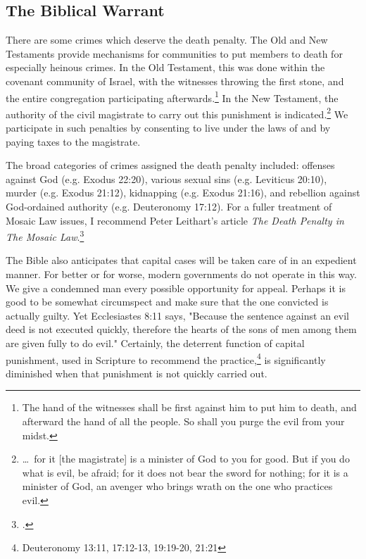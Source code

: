 \subsection{The Biblical Warrant}
There are some crimes which deserve the death penalty.  The Old and New Testaments provide mechanisms for communities to put members to death for especially heinous crimes.  In the Old Testament, this was done within the covenant community of Israel, with the witnesses throwing the first stone, and the entire congregation participating afterwards.\footnote{The hand of the witnesses shall be first against him to put him to death, and afterward the hand of all the people.  So shall you purge the evil from your midst.}  In the New Testament, the authority of the civil magistrate to carry out this punishment is indicated.\footnote{\ldots\ for it [the magistrate] is a minister of God to you for good.  But if you do what is evil, be afraid; for it does not bear the sword for nothing; for it is a minister of God, an avenger who brings wrath on the one who practices evil.}  We participate in such penalties by consenting to live under the laws of and by paying taxes to the magistrate.

The broad categories of crimes assigned the death penalty included: offenses against God (e.g. Exodus 22:20), various sexual sins (e.g. Leviticus 20:10), murder (e.g. Exodus 21:12), kidnapping (e.g. Exodus 21:16), and rebellion against God-ordained authority (e.g. Deuteronomy 17:12).  For a fuller treatment of Mosaic Law issues, I recommend Peter Leithart's article \textit{The Death Penalty in The Mosaic Law}.\footcite{leithartdeathpenalty} 

The Bible also anticipates that capital cases will be taken care of in an expedient manner.  For better or for worse, modern governments do not operate in this way.  We give a condemned man every possible opportunity for appeal.  Perhaps it is good to be somewhat circumspect and make sure that the one convicted is actually guilty.  Yet Ecclesiastes 8:11 says, "Because the sentence against an evil deed is not executed quickly, therefore the hearts of the sons of men among them are given fully to do evil." Certainly, the deterrent function of capital punishment, used in Scripture to recommend the practice,\footnote{Deuteronomy 13:11, 17:12-13, 19:19-20, 21:21} is significantly diminished when that punishment is not quickly carried out.  

